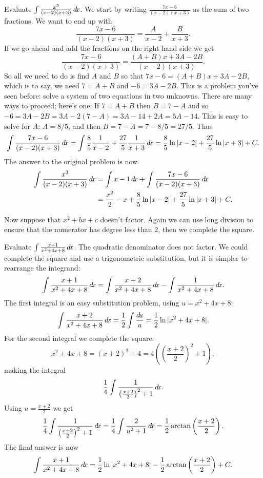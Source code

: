\documentclass{ximera}
\begin{document}
\begin{example} Evaluate $\int \frac{x^3}{(x-2)(x+3)}\mathop{}\!d\! x$.  We start by
writing $\frac{7x-6}{(x-2)(x+3)}$ as the sum of two fractions.  We
want to end up with
\[
\frac{7x-6}{(x-2)(x+3)}=\frac{A}{x-2}+\frac{B}{x+3}.
\]
If we go ahead and add the fractions on the right hand side we get
\[
\frac{7x-6}{(x-2)(x+3)}=\frac{(A+B)x+3A-2B}{(x-2)(x+3)}.
\]
So all we need to do is find $A$ and $B$ so that $7x-6=(A+B)x+3A-2B$,
which is to say, we need $7=A+B$ and $-6=3A-2B$. This is a problem
you've seen before: solve a system of two equations in two
unknowns. There are many ways to proceed; here's one: If $7=A+B$ then
$B=7-A$ and so $-6=3A-2B=3A-2(7-A)=3A-14+2A=5A-14$. This is easy to
solve for $A$: $A= 8/5$, and then $B=7-A=7-8/5=27/5$. Thus
\[
  \int \frac{7x-6}{(x-2)(x+3)}\mathop{}\!d\! x=
  \int \frac{8}{5}\frac{1}{x-2}+\frac{27}{5}\frac{1}{x+3}\mathop{}\!d\! x=
  \frac{8}{5}\ln |x-2|+\frac{27}{5}\ln|x+3|+C.
\]
The answer to the original problem is now
\begin{align*}
  \int \frac{x^3}{(x-2)(x+3)}\mathop{}\!d\! x
  &=\int x-1\mathop{}\!d\! x +\int \frac{7x-6}{(x-2)(x+3)}\mathop{}\!d\! x \\
  &=\frac{x^2}{2}-x+\frac{8}{5}\ln |x-2|+\frac{27}{5}\ln|x+3|+C. 
\end{align*}
\end{example}

Now suppose that $x^2+bx+c$ doesn't factor. Again we can use long
division to ensure that the numerator has degree less than 2, then we
complete the square.

\begin{example} 
Evaluate $\int \frac{x+1}{x^2+4x+8}\mathop{}\!d\! x$. The quadratic denominator
does not factor. We could complete the square and use a trigonometric
substitution, but it is simpler to rearrange the integrand:
\[
  \int \frac{x+1}{x^2+4x+8}\mathop{}\!d\! x = \int \frac{x+2}{x^2+4x+8}\mathop{}\!d\! x -
  \int \frac{1}{x^2+4x+8}\mathop{}\!d\! x.
\]
The first integral is an easy substitution problem, using $u=x^2+4x+8$:
\[
  \int \frac{x+2}{x^2+4x+8}\mathop{}\!d\! x=\frac{1}{2}\int \frac{\mathop{}\!d\! u}{u}=
  \frac{1}{2}\ln|x^2+4x+8|.
\]
For the second integral we complete the square:
\[
  x^2+4x+8=(x+2)^2+4=4\left(\left(\frac{x+2}{2}\right)^2+1\right),
\]
making the integral
\[
  \frac{1}{4}\int \frac{1}{\left(\frac{x+2}{2}\right)^2+1}\mathop{}\!d\! x.
\]
Using $u=\frac{x+2}{2}$ we get
\[
  \frac{1}{4}\int \frac{1}{\left(\frac{x+2}{2}\right)^2+1}\mathop{}\!d\! x=
  \frac{1}{4}\int \frac{2}{u^2+1}\mathop{}\!d\! x=
  \frac{1}{2}\arctan\left(\frac{x+2}{2}\right).
\]
The final answer is now 
\[
  \int \frac{x+1}{x^2+4x+8}\mathop{}\!d\! x=\frac{1}{2}\ln|x^2+4x+8|-
  \frac{1}{2}\arctan\left(\frac{x+2}{2}\right)+C.
\]
\end{example}
\end{document}

